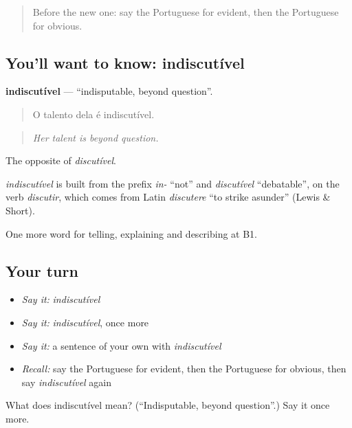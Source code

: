 \begin{quote}
Before the new one: say the Portuguese for evident, then the Portuguese for obvious.
\end{quote}

\subsection*{You'll want to know: indiscutível}
\textbf{indiscutível} — \textquotedblleft{}indisputable, beyond question\textquotedblright{}.

\begin{quote}
O talento dela é indiscutível.
\end{quote}

\begin{quote}
\emph{Her talent is beyond question.}
\end{quote}

The opposite of \emph{discutível}.

\begin{cousinweb}
\emph{indiscutível} is built from the prefix \emph{in-} \textquotedblleft{}not\textquotedblright{} and \emph{discutível} \textquotedblleft{}debatable\textquotedblright{}, on the verb \emph{discutir}, which comes from Latin \emph{discutere} \textquotedblleft{}to strike asunder\textquotedblright{} (Lewis \& Short).
\end{cousinweb}

\begin{grammarlens}[title={What you've built}]
One more word for telling, explaining and describing at B1.
\end{grammarlens}

\subsection*{Your turn}
\begin{itemize}
\raggedright
  \item \emph{Say it:} \emph{indiscutível}
  \item \emph{Say it:} \emph{indiscutível}, once more
  \item \emph{Say it:} a sentence of your own with \emph{indiscutível}
  \item \emph{Recall:} say the Portuguese for evident, then the Portuguese for obvious, then say \emph{indiscutível} again
\end{itemize}

\begin{tcolorbox}[breakable,colback=teal!4,colframe=teal!35!black,title={Before you move on}]
What does indiscutível mean? (\textquotedblleft{}Indisputable, beyond question\textquotedblright{}.) Say it once more.
\end{tcolorbox}

